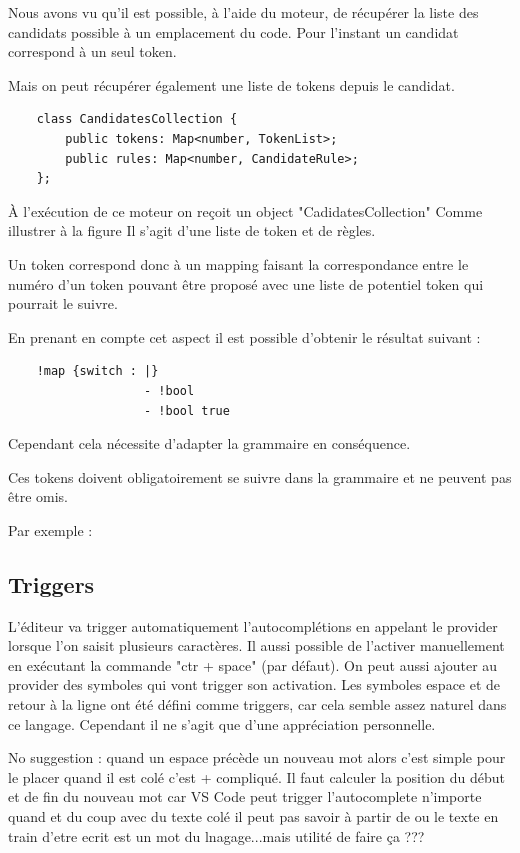 \documentclass[
    iict, %
    il, %
]{heig-tb}
\begin{document}
Nous avons vu qu'il est possible, à l'aide du moteur, de récupérer la liste des candidats possible à un emplacement du code.
Pour l'instant un candidat correspond à un seul token.

Mais on peut récupérer également une liste de tokens depuis le candidat.

\begin{lstlisting}
    class CandidatesCollection {
        public tokens: Map<number, TokenList>;
        public rules: Map<number, CandidateRule>;
    };
\end{lstlisting}


À l'exécution de ce moteur on reçoit un object "CadidatesCollection"
Comme illustrer à la figure %
Il s'agit d'une liste de token et de règles.

Un token correspond donc à un mapping faisant la correspondance entre le numéro d'un token pouvant être proposé avec une liste de potentiel token qui pourrait le suivre.

En prenant en compte cet aspect il est possible d'obtenir le résultat suivant :

\begin{lstlisting}
    !map {switch : |}
                   - !bool
                   - !bool true
\end{lstlisting}

Cependant cela nécessite d'adapter la grammaire en conséquence.

Ces tokens doivent obligatoirement se suivre dans la grammaire %
et ne peuvent pas être omis.

Par exemple : %

\subsection{Triggers}
L'éditeur va trigger automatiquement l'autocomplétions en appelant le provider lorsque l'on saisit plusieurs caractères. Il aussi possible de l'activer manuellement en exécutant la commande "ctr + space" (par défaut).
On peut aussi ajouter au provider des symboles qui vont trigger son activation. Les symboles espace et de retour à la ligne ont été défini comme triggers, car cela semble assez naturel dans ce langage. Cependant il ne s'agit que d'une appréciation personnelle.

No suggestion :
quand un espace précède un nouveau mot alors c'est simple pour le placer
quand il est colé c'est + compliqué. Il faut calculer la position du début et de fin du nouveau mot car VS Code peut trigger l'autocomplete n'importe quand et du coup
avec du texte colé il peut pas savoir à partir de ou le texte en train d'etre ecrit est un mot du lnagage...mais utilité de faire ça ???
\end{document}
